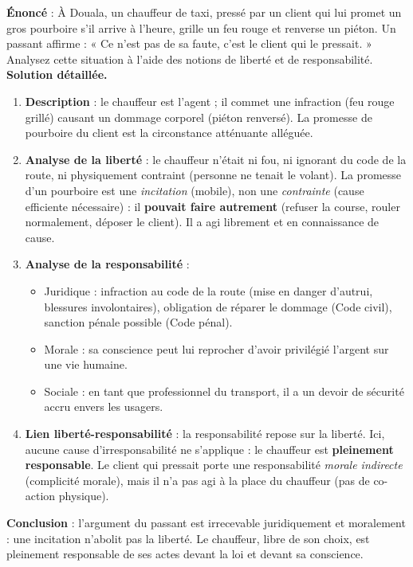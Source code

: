 \documentclass[11pt]{article}
\newcommand{\cle}[1]{{\popxbold\color{popdark}#1}}
\begin{document}
\begin{exoresolu}
\textbf{Énoncé} : À Douala, un chauffeur de taxi, pressé par un client qui lui promet un gros pourboire s'il arrive à l'heure, grille un feu rouge et renverse un piéton. Un passant affirme : « Ce n'est pas de sa faute, c'est le client qui le pressait. » Analysez cette situation à l'aide des notions de liberté et de responsabilité.
\tcblower
\textbf{Solution détaillée.}
\begin{enumerate}
\item \textbf{Description} : le chauffeur est l'agent ; il commet une infraction (feu rouge grillé) causant un dommage corporel (piéton renversé). La promesse de pourboire du client est la circonstance atténuante alléguée.
\item \textbf{Analyse de la liberté} : le chauffeur n'était ni fou, ni ignorant du code de la route, ni physiquement contraint (personne ne tenait le volant). La promesse d'un pourboire est une \emph{incitation} (mobile), non une \emph{contrainte} (cause efficiente nécessaire) : il \textbf{pouvait faire autrement} (refuser la course, rouler normalement, déposer le client). Il a agi librement et en connaissance de cause.
\item \textbf{Analyse de la responsabilité} :
\begin{itemize}
\item \cle{Juridique} : infraction au code de la route (mise en danger d'autrui, blessures involontaires), obligation de réparer le dommage (Code civil), sanction pénale possible (Code pénal).
\item \cle{Morale} : sa conscience peut lui reprocher d'avoir privilégié l'argent sur une vie humaine.
\item \cle{Sociale} : en tant que professionnel du transport, il a un devoir de sécurité accru envers les usagers.
\end{itemize}
\item \textbf{Lien liberté-responsabilité} : la responsabilité repose sur la liberté. Ici, aucune cause d'irresponsabilité ne s'applique : le chauffeur est \textbf{pleinement responsable}. Le client qui pressait porte une responsabilité \emph{morale indirecte} (complicité morale), mais il n'a pas agi à la place du chauffeur (pas de co-action physique).
\end{enumerate}
\textbf{Conclusion} : l'argument du passant est irrecevable juridiquement et moralement : une incitation n'abolit pas la liberté. Le chauffeur, libre de son choix, est pleinement responsable de ses actes devant la loi et devant sa conscience.
\end{exoresolu}
\end{document}

